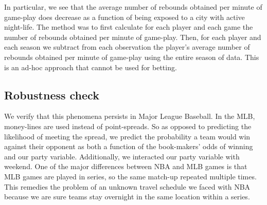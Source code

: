 \documentclass[letterpaper,12pt]{article}
\begin{document}
In particular, we see that the average number of rebounds obtained per minute
of game-play does decrease as a function of being exposed to a city with active night-life.
The method was to first calculate for each player and each game the number of rebounds obtained
per minute of game-play. Then, for each player and each season we subtract from each observation
the player's average number of rebounds obtained per minute of game-play using the entire season of data. This is an ad-hoc approach that cannot be used for betting. 


\subsection{Robustness check}
We verify that this phenomena persists in Major League Baseball. In the MLB, money-lines
are used instead of point-spreads. So as opposed to predicting
the likelihood of meeting the spread, we predict the probability
a team would win against their opponent as both a function of the book-makers'
odds of winning and our party variable. Additionally, we interacted our party variable with weekend.
One of the major differences between NBA and MLB games is that MLB games
are played in series, so the same match-up repeated multiple times. This remedies
the problem of an unknown travel schedule we faced with NBA because we are sure 
teams stay overnight in the same location within a series.
\end{document}
